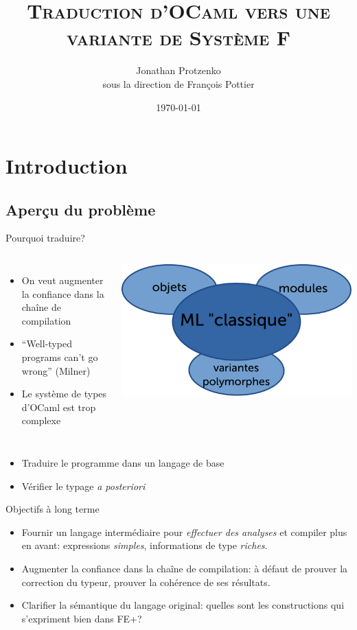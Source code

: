 \documentclass[final]{beamer}
\title{\textsc{Traduction d'OCaml vers une variante de Système F}}
\author{Jonathan Protzenko\\sous la direction de François Pottier}
\date{\today}
\begin{document}
\begin{frame}
  \titlepage
\end{frame}

\section{Introduction}

\subsection{Aperçu du problème}

\begin{frame}{Pourquoi traduire?}
  \begin{columns}
      \begin{itemize}
        \item On veut augmenter la confiance dans la chaîne de compilation
        \item ``Well-typed programs can't go wrong'' (Milner)
        \item Le système de types d'OCaml est trop complexe
      \end{itemize}
      \includegraphics[width=\columnwidth]{ocaml.pdf}
  \end{columns}
  \begin{itemize}
    \item Traduire le programme dans un langage de base
    \item Vérifier le typage \emph{a posteriori}
  \end{itemize}
\end{frame}

\begin{frame}{Objectifs à long terme}
  \begin{itemize}
    \item Fournir un langage intermédiaire pour \emph{effectuer des analyses} et
      compiler plus en avant: expressions \emph{simples}, informations de type
      \emph{riches}.
    \item Augmenter la confiance dans la chaîne de compilation: à défaut de
      prouver la correction du typeur, prouver la cohérence de ses résultats.
    \item Clarifier la sémantique du langage original: quelles sont les
      constructions qui s'expriment bien dans FE+?
  \end{itemize}
\end{frame}
\end{document}
